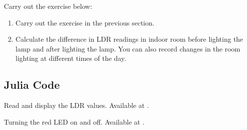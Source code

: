 \begin{exercise}
  Carry out the exercise below:
  \begin{enumerate}
    \item Carry out the exercise in the previous section.
    \item Calculate the difference in LDR readings in indoor room
          before lighting the lamp and after lighting the lamp. You can also
          record changes in the room lighting at different times of the day.
  \end{enumerate}
\end{exercise}

\subsection{Julia Code}
\label{sec:ldr-julia-code}

\begin{juliacode}
  {Read and display the LDR values.  Available at
    .}
  \label{julia:ldr-read}
  
\end{juliacode}

\begin{juliacode}
  {Turning the red LED on and off.  Available at
    .}
  \label{julia:ldr-led}
  
\end{juliacode}

